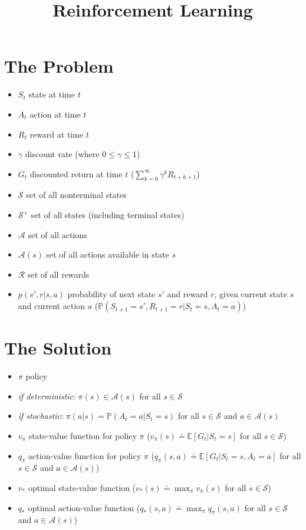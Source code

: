 \documentclass[10pt]{amsart}
\title{Reinforcement Learning}
\begin{document}
\maketitle
\thispagestyle{fancy}

\section{The Problem}

\begin{itemize}
\item[] $S_t$ \tabto{2cm} state at time $t$
\item[] $A_t$ \tabto{2cm} action at time $t$
\item[] $R_t$ \tabto{2cm} reward at time $t$
\item[] $\gamma$ \tabto{2cm} discount rate (where $0 \leq \gamma \leq 1$)
\item[] $G_t$ \tabto{2cm} discounted return at time $t$ ($\sum_{k=0}^\infty \gamma^k R_{t+k+1}$)
\item[] $\mathcal{S}$ \tabto{2cm} set of all nonterminal states
\item[] $\mathcal{S}^+$ \tabto{2cm} set of all states (including terminal states)
\item[] $\mathcal{A}$ \tabto{2cm} set of all actions 
\item[] $\mathcal{A}(s)$ \tabto{2cm} set of all actions available in state $s$
\item[] $\mathcal{R}$ \tabto{2cm} set of all rewards
\item[] $p(s',r|s,a)$ \tabto{2cm} probability of next state $s'$ and reward $r$, given current state $s$ and current action $a$ ($\mathbb{P}(S_{t+1}=s', R_{t+1}=r|S_t = s, A_t = a)$)
\end{itemize}

\section{The Solution}
\begin{itemize}
\item[] $\pi$ \tabto{2cm} policy 
\item[] \tabto{2.5cm} \textit{if deterministic}: $\pi(s) \in \mathcal{A}(s)$ for all $s \in \mathcal{S}$ 
\item[] \tabto{2.5cm} \textit{if stochastic}: $\pi(a|s) = \mathbb{P}(A_t=a|S_t=s)$ for all $s \in \mathcal{S}$ and $a \in \mathcal{A}(s)$
\item[] $v_\pi$ \tabto{2cm} state-value function for policy $\pi$ ($v_\pi(s) \doteq \mathbb{E}[G_t|S_t=s]$ for all $s\in\mathcal{S}$)
\item[] $q_\pi$ \tabto{2cm} action-value function for policy $\pi$ ($q_\pi(s,a) \doteq \mathbb{E}[G_t|S_t=s, A_t=a]$ for all $s \in \mathcal{S}$ and $a \in \mathcal{A}(s)$)
\item[] $v_*$ \tabto{2cm} optimal state-value function ($v_*(s) \doteq \max_\pi v_\pi(s)$ for all $s \in \mathcal{S}$)
\item[] $q_*$ \tabto{2cm} optimal action-value function ($q_*(s,a) \doteq \max_\pi q_\pi(s,a)$ for all $s \in \mathcal{S}$ and $a \in \mathcal{A}(s)$)
\end{itemize}
\end{document}
